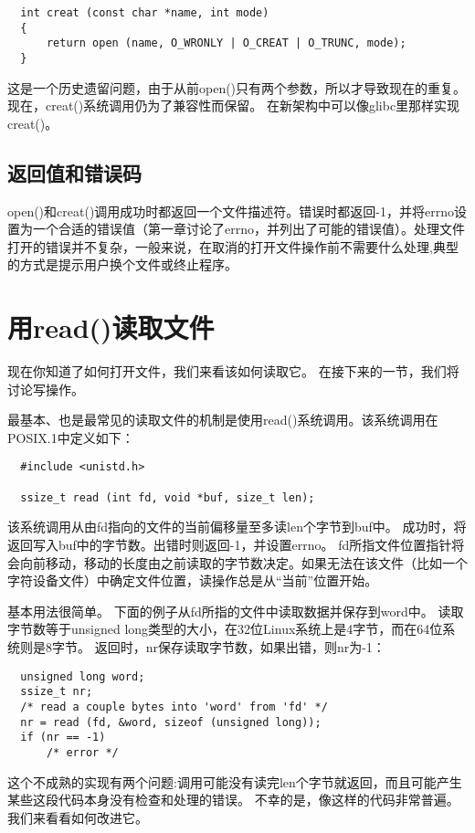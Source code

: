 \begin{lstlisting}
  int creat (const char *name, int mode)
  {
      return open (name, O_WRONLY | O_CREAT | O_TRUNC, mode);
  }
\end{lstlisting}

这是一个历史遗留问题，由于从前open()只有两个参数，所以才导致现在的重复。现在，creat()系统调用仍为了兼容性而保留。 在新架构中可以像glibc里那样实现creat()。 

\subsection{返回值和错误码}

open()和creat()调用成功时都返回一个文件描述符。错误时都返回-1，并将errno设置为一个合适的错误值（第一章讨论了errno，并列出了可能的错误值）。处理文件打开的错误并不复杂，一般来说，在取消的打开文件操作前不需要什么处理,典型的方式是提示用户换个文件或终止程序。 

\section{用read()读取文件}

现在你知道了如何打开文件，我们来看该如何读取它。 在接下来的一节，我们将讨论写操作。

最基本、也是最常见的读取文件的机制是使用read()系统调用。该系统调用在POSIX.1中定义如下： 

\begin{lstlisting}
  #include <unistd.h>

  ssize_t read (int fd, void *buf, size_t len);
\end{lstlisting}

该系统调用从由fd指向的文件的当前偏移量至多读len个字节到buf中。 成功时，将返回写入buf中的字节数。出错时则返回-1，并设置errno。 fd所指文件位置指针将会向前移动，移动的长度由之前读取的字节数决定。如果无法在该文件（比如一个字符设备文件）中确定文件位置，读操作总是从“当前”位置开始。

基本用法很简单。 下面的例子从fd所指的文件中读取数据并保存到word中。 读取字节数等于unsigned long类型的大小，在32位Linux系统上是4字节，而在64位系统则是8字节。 返回时，nr保存读取字节数，如果出错，则nr为-1： 

\begin{lstlisting}
  unsigned long word;
  ssize_t nr;
  /* read a couple bytes into 'word' from 'fd' */
  nr = read (fd, &word, sizeof (unsigned long));
  if (nr == -1)
      /* error */
\end{lstlisting}
这个不成熟的实现有两个问题:调用可能没有读完len个字节就返回，而且可能产生某些这段代码本身没有检查和处理的错误。 不幸的是，像这样的代码非常普遍。 我们来看看如何改进它。

